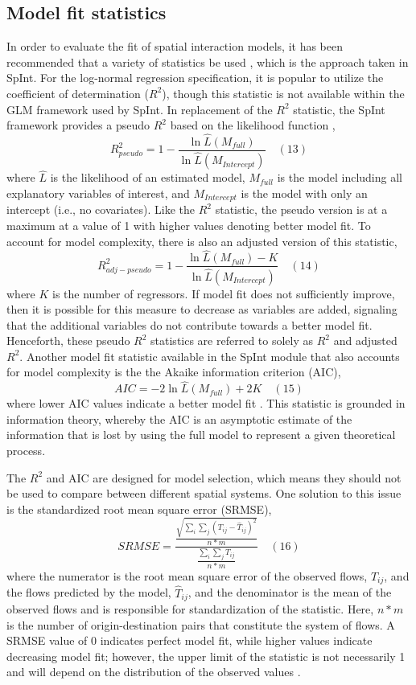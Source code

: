 \documentclass[11pt]{article}
\begin{document}
    \subsection{Model fit statistics}\label{model-fit-statistics}

    In order to evaluate the fit of spatial interaction models, it has been
recommended that a variety of statistics be used \citep{knudsen_matrix_1986}, which is the approach taken in SpInt. For the
log-normal regression specification, it is popular to utilize the
coefficient of determination (\(R^2\)), though this statistic is not
available within the GLM framework used by SpInt. In replacement of the
\(R^2\) statistic, the SpInt framework provides a pseudo \(R^2\) based
on the likelihood function \citep{mcfadden_conditional_1974},
%
\[R^2_{pseudo} = 1 - \frac{\ln \hat{L}(M_{full})}{\ln \hat{L}(M_{Intercept})} \quad(13)\]
%
where \(\hat{L}\) is the likelihood of an estimated model, \(M_{full}\)
is the model including all explanatory variables of interest, and
\(M_{Intercept}\) is the model with only an intercept (i.e., no
covariates). Like the \(R^2\) statistic, the pseudo version is at a
maximum at a value of 1 with higher values denoting better model fit. To
account for model complexity, there is also an adjusted version of this
statistic,
%
\[R^2_{adj-pseudo} = 1 - \frac{\ln \hat{L}(M_{full}) - K}{\ln \hat{L}(M_{Intercept})} \quad(14)\]
%
where \(K\) is the number of regressors. If model fit does not
sufficiently improve, then it is possible for this measure to decrease
as variables are added, signaling that the additional variables do not
contribute towards a better model fit. Henceforth, these pseudo \(R^2\)
statistics are referred to solely as \(R^2\) and adjusted \(R^2\).
Another model fit statistic available in the SpInt module that also
accounts for model complexity is the the Akaike information criterion
(AIC),
%
\[ AIC = -2\ln \hat{L}(M_{full}) + 2K  \quad(15)\]
%
where lower AIC values indicate a better model fit \citep{akaike_new_1974}. This
statistic is grounded in information theory, whereby the AIC is an
asymptotic estimate of the information that is lost by using the full
model to represent a given theoretical process.

The \(R^2\) and AIC are designed for model selection, which means
they should not be used to compare between different spatial systems.
One solution to this issue is the standardized root mean square error
(SRMSE),
%
\[ SRMSE = \frac{\frac{\sqrt{\sum_{i}\sum_{j}(T_{ij} - \hat{T}_{ij})^{2}}}{n*m}}{\frac{\sum_{i}\sum_{j}T_{ij}}{n*m}} \quad(16)\]
%
where the numerator is the root mean square error of the observed
flows, \(T_{ij}\), and the flows predicted by the model,
\(\hat{T}_{ij}\), and the denominator is the mean of the observed flows
and is responsible for standardization of the statistic. Here, \(n*m\)
is the number of origin-destination pairs that constitute the system of
flows. A SRMSE value of 0 indicates perfect model fit, while higher
values indicate decreasing model fit; however, the upper limit of the
statistic is not necessarily 1 and will depend on the distribution of
the observed values \citep{knudsen_matrix_1986}.
\end{document}

